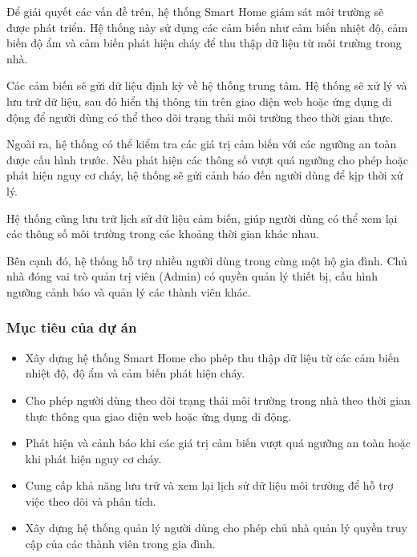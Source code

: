 \documentclass[a4paper,twoside]{article}
\begin{document}
Để giải quyết các vấn đề trên, hệ thống Smart Home giám sát môi trường
sẽ được phát triển. Hệ thống này sử dụng các cảm biến như cảm biến
nhiệt độ, cảm biến độ ẩm và cảm biến phát hiện cháy để thu thập dữ liệu
từ môi trường trong nhà.

Các cảm biến sẽ gửi dữ liệu định kỳ về hệ thống trung tâm.
Hệ thống sẽ xử lý và lưu trữ dữ liệu, sau đó hiển thị thông tin
trên giao diện web hoặc ứng dụng di động để người dùng có thể
theo dõi trạng thái môi trường theo thời gian thực.

Ngoài ra, hệ thống có thể kiểm tra các giá trị cảm biến
với các ngưỡng an toàn được cấu hình trước.
Nếu phát hiện các thông số vượt quá ngưỡng cho phép
hoặc phát hiện nguy cơ cháy, hệ thống sẽ gửi cảnh báo
đến người dùng để kịp thời xử lý.

Hệ thống cũng lưu trữ lịch sử dữ liệu cảm biến,
giúp người dùng có thể xem lại các thông số môi trường
trong các khoảng thời gian khác nhau.

Bên cạnh đó, hệ thống hỗ trợ nhiều người dùng
trong cùng một hộ gia đình. Chủ nhà đóng vai trò
quản trị viên (Admin) có quyền quản lý thiết bị,
cấu hình ngưỡng cảnh báo và quản lý các thành viên khác.

\subsubsection{Mục tiêu của dự án}

\begin{itemize}

\item Xây dựng hệ thống Smart Home cho phép thu thập dữ liệu
từ các cảm biến nhiệt độ, độ ẩm và cảm biến phát hiện cháy.

\item Cho phép người dùng theo dõi trạng thái môi trường
trong nhà theo thời gian thực thông qua giao diện web
hoặc ứng dụng di động.

\item Phát hiện và cảnh báo khi các giá trị cảm biến
vượt quá ngưỡng an toàn hoặc khi phát hiện nguy cơ cháy.

\item Cung cấp khả năng lưu trữ và xem lại lịch sử dữ liệu
môi trường để hỗ trợ việc theo dõi và phân tích.

\item Xây dựng hệ thống quản lý người dùng cho phép
chủ nhà quản lý quyền truy cập của các thành viên
trong gia đình.

\end{itemize}
\end{document}
